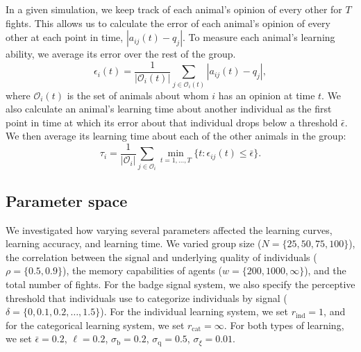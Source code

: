 In a given simulation, we keep track of each animal's opinion of every other for $T$ fights. This allows us to calculate the error of each animal's opinion of every other at each point in time, $|a_{ij}(t)-q_j|$. To measure each animal's learning ability, we average its error over the rest of the group. 
\begin{equation*}
\epsilon_i(t) = \frac{1}{|\mathscr{O}_i(t)|}\sum_{j\in \mathscr{O}_i(t)}|a_{ij}(t)-q_j|,
\end{equation*}
where $\mathscr{O}_i(t)$ is the set of animals about whom $i$ has an opinion at time $t$.
We also calculate an animal's learning time about another individual as the first point in time at which its error about that individual drops below a threshold $\bar{\epsilon}$. We then average its learning time about each of the other animals in the group:
\begin{equation*}
\tau_{i} = \frac{1}{|\mathscr{O}_i|} \sum_{j\in\mathscr{O}_i} \min_{t=1,\dots,T}\{t: \epsilon_{ij}(t)\leq\bar{\epsilon}\}.
\end{equation*}
%
\subsection*{Parameter space}
%
We investigated how varying several parameters affected the learning curves, learning accuracy, and learning time. We varied group size ($N=\{25, 50, 75, 100\}$), the correlation between the signal and underlying quality of individuals ($\rho=\{0.5,0.9\}$), the memory capabilities of agents ($w=\{200,1000,\infty\}$), and the total number of fights. For the badge signal system, we also specify the perceptive threshold that individuals use to categorize individuals by signal ($\delta=\{0,0.1,0.2,\dots,1.5\}$). For the individual learning system, we set $r_\text{ind}=1$, and for the categorical learning system, we set $r_\text{cat}=\infty$. For both types of learning, we set $\bar{\epsilon}=0.2$, $\ell=0.2$, $\sigma_\text{b}=0.2$, $\sigma_\text{q}=0.5$, $\sigma_\xi=0.01$.

%
